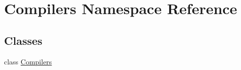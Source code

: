 \hypertarget{namespace_compilers}{\section{Compilers Namespace Reference}
\label{namespace_compilers}
}
\subsection*{Classes}
\begin{DoxyCompactItemize}
\item 
class \hyperlink{class_compilers_1_1_compilers}{Compilers}
\end{DoxyCompactItemize}
